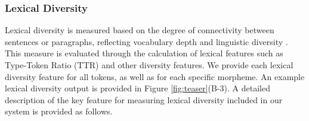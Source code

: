 \subsubsection*{Lexical Diversity}
Lexical diversity \cite{hout2007richness} 
 is measured based on the degree of connectivity between sentences or paragraphs, reflecting vocabulary depth and linguistic diversity \cite{ha2019lexical, kim2024korcat}.
This measure is evaluated through the calculation of lexical features such as Type-Token Ratio (TTR) and other diversity features. 
We provide each lexical diversity feature for all tokens, as well as for each specific morpheme. An example lexical diversity output is provided in Figure \ref{fig:teaser}(B-3).
A detailed description of the key feature for measuring lexical diversity included in our system is provided as follows.

